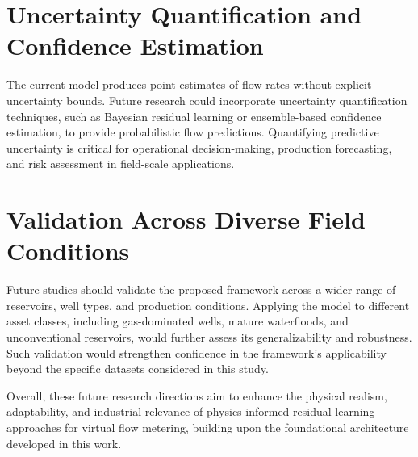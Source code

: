\documentclass[12pt,APA]{uomthesis}
\begin{document}
\section{Uncertainty Quantification and Confidence Estimation}
The current model produces point estimates of flow rates without explicit uncertainty bounds. Future research could incorporate uncertainty quantification techniques, such as Bayesian residual learning or ensemble-based confidence estimation, to provide probabilistic flow predictions. Quantifying predictive uncertainty is critical for operational decision-making, production forecasting, and risk assessment in field-scale applications.

\section{Validation Across Diverse Field Conditions}
Future studies should validate the proposed framework across a wider range of reservoirs, well types, and production conditions. Applying the model to different asset classes, including gas-dominated wells, mature waterfloods, and unconventional reservoirs, would further assess its generalizability and robustness. Such validation would strengthen confidence in the framework's applicability beyond the specific datasets considered in this study.

Overall, these future research directions aim to enhance the physical realism, adaptability, and industrial relevance of physics-informed residual learning approaches for virtual flow metering, building upon the foundational architecture developed in this work.

\begin{references}
\end{references}
\end{document}
